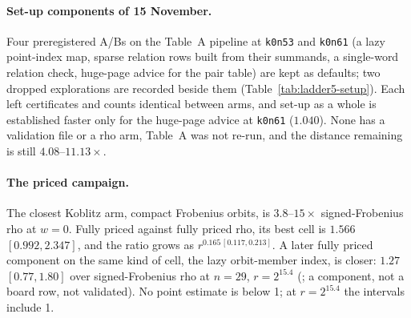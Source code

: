 \begin{table}[t]
\centering\small
\setlength{\tabcolsep}{4pt}

\caption[]{Cold IC over cold rho as built, every cell of every rule version,
with 95\% intervals; last rows: the fitted slope of the ratio in $\ln r$
over six sizes (v4 fits none). Sources:
(\texttt{cold\_ratio\_ic\_over\_rho}; v4:
\texttt{gap\_ic\_cold\_over\_rho\_cold.v4\_as\_built}). Data:
.}
\label{tab:fr-rule}
\end{table}

\begin{table}[t]
\centering\small
\setlength{\tabcolsep}{4pt}

\caption[]{Cold IC over rho priced at the canonical batched step, every
cell of every rule version; a model of rho, not a measured rho. Sources:
\texttt{diagnostics.cold\_ratio\_rho\_at\_canonical\_step} of each
; v4:
\texttt{gap\_ic\_cold\_over\_rho\_cold.v4\_canonical}, with its interval.
Data: .}
\label{tab:fr-rulecanon}
\end{table}

\paragraph{Set-up components of 15 November.} Four preregistered A/Bs on
the Table~A pipeline at \texttt{k0n53} and \texttt{k0n61} (a lazy point-index
map, sparse relation rows built from their summands, a single-word relation
check, huge-page advice for the pair table) are kept as defaults; two
dropped explorations are recorded beside them
(Table~\ref{tab:ladder5-setup}). Each left certificates and counts
identical between arms, and set-up as a whole is established faster only for
the huge-page advice at \texttt{k0n61} ($1.040$). None has a validation
file or a rho arm, Table~A was not re-run, and the distance remaining is
still $4.08$--$11.13\times$.

\paragraph{The priced campaign.} The closest Koblitz arm, compact
Frobenius orbits, is $3.8$--$15\times$ signed-Frobenius rho at $w=0$. Fully
priced against fully priced rho, its best cell is $1.566$ $[0.992,2.347]$,
and the ratio grows as $r^{0.165\,[0.117,0.213]}$. A later fully priced
component on the same kind of cell, the lazy orbit-member index, is closer:
$1.27$ $[0.77,1.80]$ over signed-Frobenius rho at $n=29$, $r=2^{15.4}$
(; a component, not a
board row, not validated). No point estimate is below 1; at $r=2^{15.4}$
the intervals include 1.

